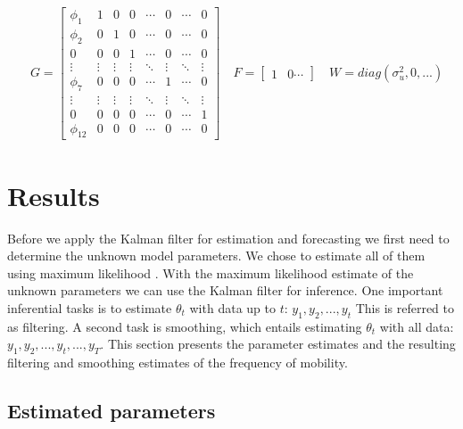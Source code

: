 \documentclass[12pt, a4paper]{article}
\begin{document}
\begin{align*}
& G = \begin{bmatrix} 
\phi_{1}  & 1      & 0      & 0      & \cdots & 0      & \cdots & 0      \\
\phi_{2}  & 0      & 1      & 0      & \cdots & 0      & \cdots & 0      \\
0         & 0      & 0      & 1      & \cdots & 0      & \cdots & 0      \\
\vdots    & \vdots & \vdots & \vdots & \ddots & \vdots & \ddots & \vdots \\
\phi_{7}  & 0      & 0      & 0      & \cdots & 1      & \cdots & 0      \\
\vdots    & \vdots & \vdots & \vdots & \ddots & \vdots & \ddots & \vdots \\
0         & 0      & 0      & 0      & \cdots & 0      & \cdots & 1      \\
\phi_{12} & 0      & 0      & 0      & \cdots & 0      & \cdots & 0
\end{bmatrix} \quad F = \begin{bmatrix} 1 & 0 \cdots \end{bmatrix} \quad W = diag(\sigma_{u}^{2}, 0, ...)
\end{align*}


\section{Results}\label{results}

Before we apply the Kalman filter for estimation and forecasting we first need to determine the
unknown model parameters. We chose to estimate all of them using maximum
likelihood \citep[see][ch.~4]{petris2009dynamic}. With the maximum likelihood estimate of the unknown parameters we can use the Kalman filter for inference. One important inferential tasks is to estimate $\theta_{t}$ with data up to $t$: $y_{1}, y_{2}, ..., y_{t}$ This is referred to as filtering. A second task is smoothing, which entails estimating $\theta_{t}$ with all data: $y_{1}, y_{2}, ..., y_{t}, ..., y_{T}$. This section presents the parameter estimates and the resulting filtering and smoothing estimates of the frequency of mobility.

\subsection{Estimated parameters}\label{estimated-parameters}
\end{document}
